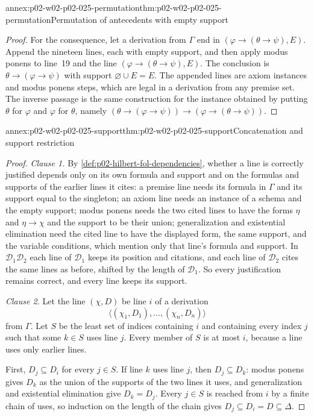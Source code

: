 \begin{annexitem}{annex:p02-w02-p02-025-permutation}{thm:p02-w02-p02-025-permutation}{Permutation of antecedents with empty support}
\begin{proof}
For the consequence, let a derivation from \(\Gamma\) end in
\((\varphi\to(\theta\to\psi),E)\).  Append the nineteen lines, each with
empty support, and then apply modus ponens to line~19 and the line
\((\varphi\to(\theta\to\psi),E)\).  The conclusion is
\(\theta\to(\varphi\to\psi)\) with support \(\varnothing\cup E=E\).  The
appended lines are axiom instances and modus ponens steps, which are legal
in a derivation from any premise set.  The inverse passage is the same
construction for the instance obtained by putting \(\theta\) for
\(\varphi\) and \(\varphi\) for \(\theta\), namely
\((\theta\to(\varphi\to\psi))\to(\varphi\to(\theta\to\psi))\).
\end{proof}
\end{annexitem}

\begin{annexitem}{annex:p02-w02-p02-025-support}{thm:p02-w02-p02-025-support}{Concatenation and support restriction}
\begin{proof}
\emph{Clause 1.}  By \cref{def:p02-hilbert-fol-dependencies}, whether a line
is correctly justified depends only on its own formula and support and on
the formulas and supports of the earlier lines it cites: a premise line
needs its formula in \(\Gamma\) and its support equal to the singleton; an
axiom line needs an instance of a schema and the empty support; modus ponens
needs the two cited lines to have the forms \(\eta\) and \(\eta\to\chi\) and
the support to be their union; generalization and existential elimination
need the cited line to have the displayed form, the same support, and the
variable conditions, which mention only that line's formula and support.
In \(\mathcal D_1\mathcal D_2\) each line of \(\mathcal D_1\) keeps its
position and citations, and each line of \(\mathcal D_2\) cites the same
lines as before, shifted by the length of \(\mathcal D_1\).  So every
justification remains correct, and every line keeps its support.

\emph{Clause 2.}  Let the line \((\chi,D)\) be line \(i\) of a derivation
\[
 \langle(\chi_1,D_1),\ldots,(\chi_n,D_n)\rangle
\]
from \(\Gamma\).  Let
\(S\) be the least set of indices containing \(i\) and containing every index
\(j\) such that some \(k\in S\) uses line \(j\).  Every member of \(S\) is at
most \(i\), because a line uses only earlier lines.

First, \(D_j\subseteq D_i\) for every \(j\in S\).  If line \(k\) uses line
\(j\), then \(D_j\subseteq D_k\): modus ponens gives \(D_k\) as the union of
the supports of the two lines it uses, and generalization and existential
elimination give \(D_k=D_j\).  Every \(j\in S\) is reached from \(i\) by a
finite chain of uses, so induction on the length of the chain gives
\(D_j\subseteq D_i=D\subseteq\Delta\).


\end{proof}
\end{annexitem}
